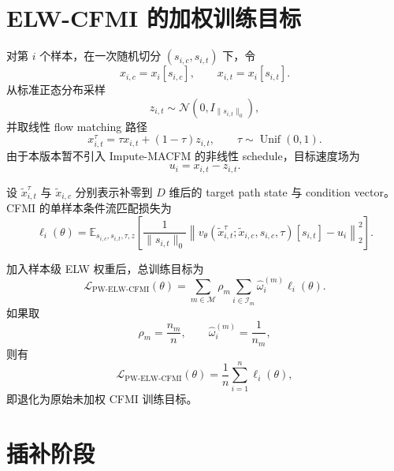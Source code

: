 \documentclass[12pt,a4paper]{article}
\newcommand{\E}{\mathbb{E}}
\newcommand{\N}{\mathcal{N}}
\newcommand{\Mcal}{\mathcal{M}}
\newcommand{\Ical}{\mathcal{I}}
\newcommand{\Lcal}{\mathcal{L}}
\newcommand{\what}{\widehat}
\newcommand{\wt}{\widetilde}
\DeclareMathOperator{\Unif}{Unif}
\begin{document}
\section{ELW-CFMI 的加权训练目标}

对第 $i$ 个样本，在一次随机切分 $(s_{i,c},s_{i,t})$ 下，令
\begin{equation}
    x_{i,c}=x_i[s_{i,c}],
    \qquad
    x_{i,t}=x_i[s_{i,t}].
\end{equation}
从标准正态分布采样
\begin{equation}
    z_{i,t}\sim \N(0,I_{\|s_{i,t}\|_0}),
\end{equation}
并取线性 flow matching 路径
\begin{equation}
    x^{\tau}_{i,t}=\tau x_{i,t}+(1-\tau)z_{i,t},
    \qquad
    \tau\sim\Unif(0,1).
\end{equation}
由于本版本暂不引入 Impute-MACFM 的非线性 schedule，目标速度场为
\begin{equation}
    u_i=x_{i,t}-z_{i,t}.
\end{equation}

设 $\wt{x}^{\tau}_{i,t}$ 与 $\wt{x}_{i,c}$ 分别表示补零到 $D$ 维后的 target path state 与 condition vector。CFMI 的单样本条件流匹配损失为
\begin{equation}
    \ell_i(\theta)
    =
    \E_{s_{i,c},s_{i,t},\tau,z}
    \left[
    \frac{1}{\|s_{i,t}\|_0}
    \left\|
    v_{\theta}(\wt{x}^{\tau}_{i,t};\wt{x}_{i,c},s_{i,c},\tau)[s_{i,t}]-u_i
    \right\|_2^2
    \right].
\end{equation}

加入样本级 ELW 权重后，总训练目标为
\begin{equation}
    \Lcal_{\mathrm{PW\text{-}ELW\text{-}CFMI}}(\theta)
    =
    \sum_{m\in\Mcal}\rho_m
    \sum_{i\in\Ical_m}
    \what{\omega}^{(m)}_i\ell_i(\theta).
\end{equation}
如果取
\begin{equation}
    \rho_m=\frac{n_m}{n},
    \qquad
    \what{\omega}^{(m)}_i=\frac{1}{n_m},
\end{equation}
则有
\begin{equation}
    \Lcal_{\mathrm{PW\text{-}ELW\text{-}CFMI}}(\theta)
    =
    \frac{1}{n}\sum_{i=1}^{n}\ell_i(\theta),
\end{equation}
即退化为原始未加权 CFMI 训练目标。

\section{插补阶段}
\end{document}
